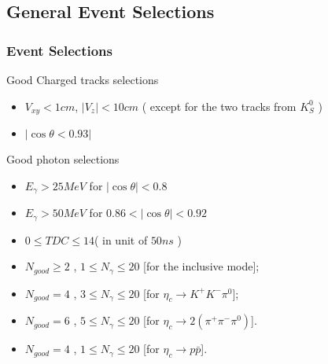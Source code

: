 \documentclass{beamer}
\begin{document}
\subsection{General Event Selections}
\begin{frame}
  \frametitle{Event Selections}
  \begin{block}{Good Charged tracks selections}
    \begin{itemize}
      \item $V_{xy} < 1 cm$, $ | V_z | < 10 cm$ ( except for the two tracks from $K_S^0$ )
      \item $|\cos\theta < 0.93 |$
    \end{itemize}
  \end{block}
  \begin{block}{Good photon selections}
    \begin{itemize}
      \item $E_{\gamma} > 25 MeV$ for $|\cos\theta| < 0.8$
      \item $E_{\gamma} > 50 MeV$ for $0.86<|\cos\theta|<0.92$
      \item $0\leq TDC\leq 14 $( in unit of $50ns$ )
    \end{itemize}
  \end{block}
  \begin{block}{}
    \begin{itemize}
      \item $N_{good}\ge 2$ ,  $1\leq N_{\gamma}\leq 20$ [for the inclusive mode];
      \item $N_{good} = 4$ ,  $3\leq N_{\gamma}\leq 20$ [for $\eta_c\to K^+K^-\pi^0$];
      \item $N_{good} = 6$ ,  $5\le N_{\gamma}\le 20 $  [for $\eta_c\to 2(\pi^+\pi^-\pi^0)$].
      \item $N_{good} = 4$ ,  $1\le N_{\gamma}\le 20 $  [for $\eta_c\to p \bar{p}$].
    \end{itemize}
  \end{block}
  \bigskip
\end{frame}
\end{document}
